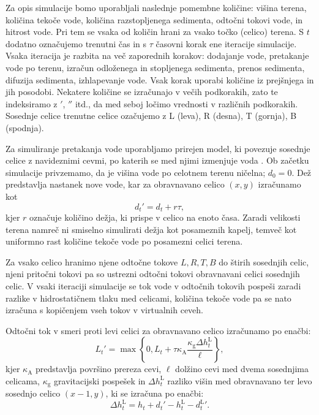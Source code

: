 \documentclass[9pt]{pnas-new}
\newcommand{\const}[1]{{\ensuremath{\kappa_\mathrm{#1}}}}
\begin{document}
Za opis simulacije bomo uporabljali naslednje pomembne količine: višina terena, količina tekoče vode, količina razstopljenega sedimenta, odtočni tokovi vode, in hitrost vode. Pri tem se vsaka od količin hrani za vsako točko (celico) terena. S $t$ dodatno označujemo trenutni čas in s $\tau$ časovni korak ene iteracije simulacije. Vsaka iteracija je razbita na več zaporednih korakov: dodajanje vode, pretakanje vode po terenu, izračun odloženega in stopljenega sedimenta, prenos sedimenta, difuzija sedimenta, izhlapevanje vode. Vsak korak uporabi količine iz prejšnjega in jih posodobi. Nekatere količine se izračunajo v večih podkorakih, zato te indeksiramo z $'$, $''$ itd., da med seboj ločimo vrednosti v različnih podkorakih. Sosednje celice trenutne celice ozačujemo z L (leva), R (desna), T (gornja), B (spodnja).

Za simuliranje pretakanja vode uporabljamo prirejen model, ki povezuje sosednje celice z navideznimi cevmi, po katerih se med njimi izmenjuje voda \cite{splashing_fluids_95}. Ob začetku simulacije privzemamo, da je višina vode po celotnem terenu ničelna; $d_0=0$. Dež predstavlja nastanek nove vode, kar za obravnavano celico $(x,y)$ izračunamo kot
\begin{equation} \label{eq:new_water}
{d_{t}}' = d_t + r \tau,
\end{equation}
kjer $r$ označuje količino dežja, ki prispe v celico na enoto časa. Zaradi velikosti terena namreč ni smiselno simulirati dežja kot posameznih kapelj, temveč kot uniformno rast količine tekoče vode po posamezni celici terena. 

Za vsako celico hranimo njene odtočne tokove $L, R, T, B$ do štirih sosednjih celic, njeni pritočni tokovi pa so ustrezni odtočni tokovi obravnavani celici sosednjih celic. V vsaki iteraciji simulacije se tok vode v odtočnih tokovih pospeši zaradi razlike v hidrostatičnem tlaku med celicami, količina tekoče vode pa se nato izračuna s kopičenjem vseh tokov v virtualnih ceveh. 

Odtočni tok v smeri proti levi celici za obravnavano celico izračunamo po enačbi: 
\begin{equation} \label{L0}
{L_{t}}' = \max\left\{0, L_t + \tau\const{A} \frac{\const{g} \Delta h^\mathrm{L}_t}{\ell} \right\},
\end{equation}
kjer $\const{A}$ predstavlja površino prereza cevi, $\ell$ dolžino cevi med dvema sosednjima celicama, $\const{g}$ gravitacijski pospešek in $\Delta h^\mathrm{L}_t$ razliko višin med obravnavano ter levo sosednjo celico $(x-1, y)$, ki se izračuna po enačbi:
\begin{equation}
\Delta h^\mathrm{L}_t = h_t + {d_{t}}' - h^\mathrm{L}_t - {d^\mathrm{L}_{t}}'.
\end{equation}
\end{document}
